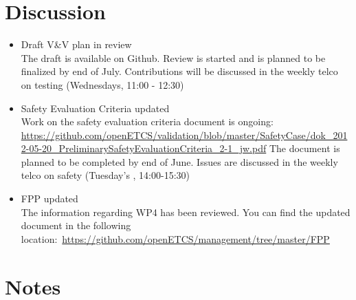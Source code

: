 \documentclass[a4paper, 11pt]{article}
\begin{document}
\section{Discussion}
\begin{itemize}
\item Draft V\&V plan in review\\
The draft is available on Github. Review is started and is planned to be finalized by end of July.
Contributions will be discussed in the weekly telco on testing (Wednesdays, 11:00 - 12:30)
\item Safety Evaluation Criteria updated\\
Work on the safety evaluation criteria document is ongoing:\\
\url{https://github.com/openETCS/validation/blob/master/SafetyCase/dok_2012-05-20_PreliminarySafetyEvaluationCriteria_2-1_jw.pdf} The document is planned to be completed by end of June. Issues are discussed in the weekly telco on safety (Tuesday's , 14:00-15:30)\\
\item FPP updated\\
The information regarding WP4 has been reviewed.
You can find the updated document in the following location:\
\url{https://github.com/openETCS/management/tree/master/FPP}
\end{itemize}


\section{Notes}
\end{document}
